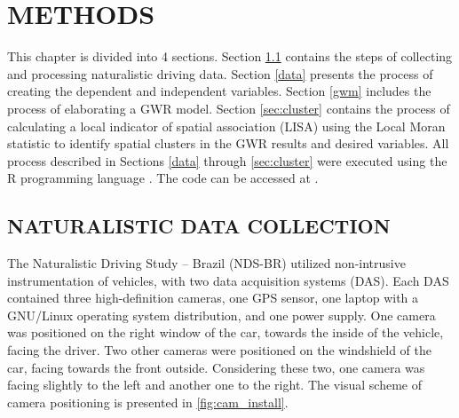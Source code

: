
\chapter{METHODS} \label{cap:methods}

This chapter is divided into 4 sections. Section \ref{ndsc} contains the steps of collecting and processing naturalistic driving data. Section \ref{data} presents the process of creating the dependent and independent variables. Section \ref{gwm} includes the process of elaborating a GWR model. Section \ref{sec:cluster} contains the process of calculating a local indicator of spatial association (LISA) using the Local Moran statistic to identify spatial clusters in the GWR results and desired variables. All process described in Sections \ref{data} through \ref{sec:cluster} were executed using the R programming language \cite{rcoreteam2021}. The code can be accessed at \textcite{santos2022}.  
 
\section{NATURALISTIC DATA COLLECTION} \label{ndsc}




The Naturalistic Driving Study – Brazil (NDS-BR) utilized non-intrusive instrumentation of vehicles, with two data acquisition systems (DAS). Each DAS contained three high-definition cameras, one GPS sensor, one laptop with a GNU/Linux operating system distribution, and one power supply. One camera was positioned on the right window of the car, towards the inside of the vehicle, facing the driver. Two other cameras were positioned on the windshield of the car, facing towards the front outside. Considering these two, one camera was facing slightly to the left and another one to the right. The visual scheme of camera positioning is presented in \autoref{fig:cam_install}.

